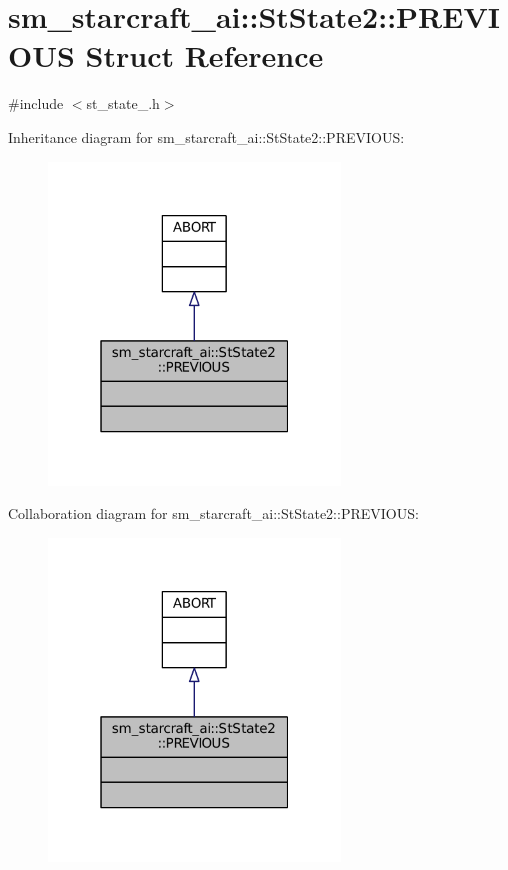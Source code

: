 \hypertarget{structsm__starcraft__ai_1_1StState2_1_1PREVIOUS}{}\section{sm\+\_\+starcraft\+\_\+ai\+:\+:St\+State2\+:\+:P\+R\+E\+V\+I\+O\+US Struct Reference}
\label{structsm__starcraft__ai_1_1StState2_1_1PREVIOUS}


{\ttfamily \#include $<$st\+\_\+state\+\_.\+h$>$}



Inheritance diagram for sm\+\_\+starcraft\+\_\+ai\+:\+:St\+State2\+:\+:P\+R\+E\+V\+I\+O\+US\+:
\nopagebreak
\begin{figure}[H]
\begin{center}
\leavevmode
\includegraphics[width=220pt]{structsm__starcraft__ai_1_1StState2_1_1PREVIOUS__inherit__graph}
\end{center}
\end{figure}


Collaboration diagram for sm\+\_\+starcraft\+\_\+ai\+:\+:St\+State2\+:\+:P\+R\+E\+V\+I\+O\+US\+:
\nopagebreak
\begin{figure}[H]
\begin{center}
\leavevmode
\includegraphics[width=220pt]{structsm__starcraft__ai_1_1StState2_1_1PREVIOUS__coll__graph}
\end{center}
\end{figure}


